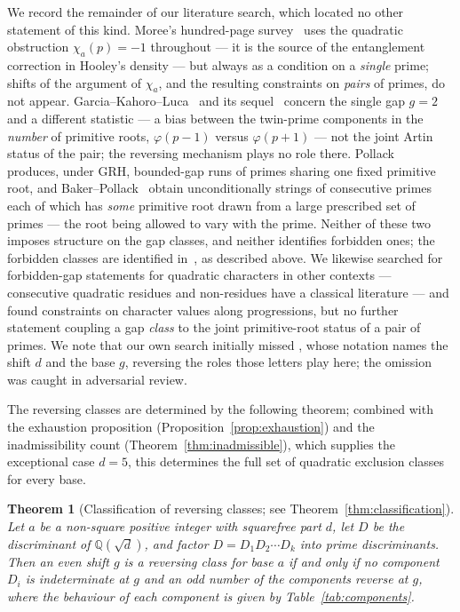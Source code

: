 \documentclass[11pt,reqno]{amsart}
\theoremstyle{plain}
\newtheorem{theorem}{Theorem}
\theoremstyle{definition}
\newcommand{\Q}{\mathbb{Q}}
\begin{document}
We record the remainder of our literature search, which located no other
statement of this kind. Moree's hundred-page
survey~\cite{Moree2012} uses the quadratic obstruction $\chi_a(p) = -1$
throughout --- it is the source of the entanglement correction in Hooley's
density --- but always as a condition on a \emph{single} prime; shifts of the
argument of $\chi_a$, and the resulting constraints on \emph{pairs} of primes,
do not appear. Garcia--Kahoro--Luca~\cite{GarciaKahoroLuca2019} and its
sequel~\cite{GarciaLucaShiUdell2020} concern the single gap $g = 2$ and a
different statistic --- a bias between the twin-prime components in the
\emph{number} of primitive roots, $\varphi(p-1)$ versus $\varphi(p+1)$ --- not
the joint Artin status of the pair; the reversing mechanism plays no role
there. Pollack~\cite{Pollack2014} produces, under GRH, bounded-gap runs of primes
sharing one fixed primitive root, and
Baker--Pollack~\cite{BakerPollack2016} obtain unconditionally strings of
consecutive primes each of which has \emph{some} primitive root drawn from a
large prescribed set of primes --- the root being allowed to vary with the
prime. Neither of these two imposes structure on the gap classes, and neither
identifies forbidden ones; the forbidden classes are identified
in~\cite{TinkovaWaxmanZindulka2023}, as described above. We likewise searched
for forbidden-gap statements for quadratic characters in other contexts ---
consecutive quadratic residues and non-residues have a classical literature
--- and found constraints on character values along progressions, but no
further statement coupling a gap \emph{class} to the joint primitive-root
status of a pair of primes. We note that our own search initially missed
\cite{TinkovaWaxmanZindulka2023}, whose notation names the shift $d$ and the
base $g$, reversing the roles those letters play here; the omission was caught
in adversarial review.

The reversing classes are determined by the following theorem; combined with
the exhaustion proposition (Proposition~\ref{prop:exhaustion}) and the
inadmissibility count (Theorem~\ref{thm:inadmissible}), which supplies the
exceptional case $d = 5$, this determines the full set of quadratic exclusion
classes for every base.

\begin{theorem}[Classification of reversing classes; see
Theorem~\ref{thm:classification}]
Let $a$ be a non-square positive integer with squarefree part $d$, let $D$ be
the discriminant of $\Q(\sqrt{d})$, and factor $D = D_1 D_2 \cdots D_k$ into
prime discriminants. Then an even shift $g$ is a reversing class for base $a$
if and only if no component $D_i$ is \emph{indeterminate} at $g$ and an odd
number of the components \emph{reverse} at $g$, where the behaviour of each
component is given by Table~\ref{tab:components}.
\end{theorem}
\end{document}
